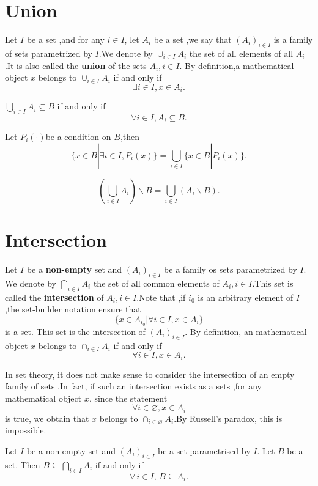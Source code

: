 \documentclass{book}
\numberwithin{equation}{section}
\begin{document}
\section{Union}
\begin{definitionenv}
    Let $I$ be a set ,and for any $i \in I$, let $A_i$ be a set ,we say that $(A_i)_{i\in I}$ is a family of sets parametrized by $I$.We denote by $\cup_{i \in I}A_i$ the set of all elements of all $A_i$.It is also called the \textbf{union} of the sets $A_i,i\in I$. By definition,a mathematical object $x$ belongs to $\cup_{i \in I}A_i$ if and only if $$\exists i\in I,x\in A_i.$$ 
\end{definitionenv}
\begin{propositionenv}
    $ \displaystyle \bigcup_{i\in I}A_i\subseteq B$ if and only if $$\forall i\in I,A_i\subseteq B.$$
\end{propositionenv}
\begin{corollaryenv}\label{corollary2.6.1}
    Let $P_i(\cdot) $be a condition on $B$,then
    $$\{x\in B|\exists i\in I,P_i(x)\}=\bigcup_{i\in I}\{x\in B|P_i(x)\}.$$
\end{corollaryenv}
\begin{propositionenv}
    $$\left( \bigcup _{i\in I}A_i\right)\backslash B=\bigcup_{i\in I}\left( A_i\backslash B\right).$$
\end{propositionenv}
\section{Intersection}
\begin{definitionenv}
    Let $I$ be a \textbf{non-empty} set and $(A_i)_{i\in I} $ be a family os sets parametrized by $I$. We denote by $\displaystyle \bigcap_{i\in I}A_i $ the set of all common elements of $A_i,i\in I$.This set is called the \textbf{intersection} of $A_i,i\in I$.Note that ,if $i_0$ is an arbitrary element of $I$ ,the set-builder notation ensure that
    $$\{x\in A_{i_0}|\forall i\in I,x\in A_i\}$$ is a set. This set is the intersection of $(A_i)_{i\in I}$.
    \newline
    By definition, an mathematical object $x$ belongs to $\cap _{i\in I}A_i$ if and only if $$\forall i\in I ,x\in A_i.$$
    
\end{definitionenv}
\begin{remark}
    In set theory, it does not make sense to consider the intersection of an empty family of sets .In fact, if such an intersection exists as a sets ,for any mathematical object $x$, since the statement $$\forall i\in \varnothing,x \in A_i$$is true, we obtain that $x$ belongs to $\cap_{i\in \varnothing}A_i$.By Russell's paradox, this is impossible.
\end{remark}
\begin{propositionenv}\label{proposition2.7.1}
Let \( I \) be a non-empty set and \( (A_i)_{i \in I} \) be a set parametrised by \( I \). Let \( B \) be a set. Then \( B \subseteq \bigcap_{i \in I} A_i \) if and only if
\[
\forall\, i \in I,\, B \subseteq A_i.
\]
\end{propositionenv}
\end{document}

